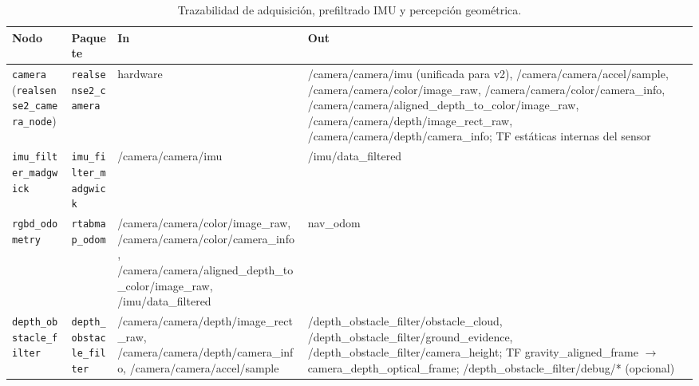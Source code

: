 \begin{table}[p]
    \centering
    \scriptsize
    \setlength{\extrarowheight}{2pt}
    \begin{tabularx}{\textwidth}{L{2.8cm}L{2.2cm}XX}
        \hline
        \textbf{Nodo} & \textbf{Paquete} & \textbf{In} & \textbf{Out} \\
        \hline
        \texttt{camera} (\texttt{realsense2\_camera\_node}) & \texttt{realsense2\_camera} & hardware & /camera/camera/imu (unificada para v2), /camera/camera/accel/sample, /camera/camera/color/image\_raw, /camera/camera/color/camera\_info, /camera/camera/aligned\_depth\_to\_color/image\_raw, /camera/camera/depth/image\_rect\_raw, /camera/camera/depth/camera\_info; TF estáticas internas del sensor \\
        \addlinespace
        \texttt{imu\_filter\_madgwick} & \texttt{imu\_filter\_madgwick} & /camera/camera/imu & /imu/data\_filtered \\
        \addlinespace
        \texttt{rgbd\_odometry} & \texttt{rtabmap\_odom} & /camera/camera/color/image\_raw, /camera/camera/color/camera\_info, /camera/camera/aligned\_depth\_to\_color/image\_raw, /imu/data\_filtered & nav\_odom \\
        \addlinespace
        \texttt{depth\_obstacle\_filter} & \texttt{depth\_obstacle\_filter} & /camera/camera/depth/image\_rect\_raw, /camera/camera/depth/camera\_info, /camera/camera/accel/sample & /depth\_obstacle\_filter/obstacle\_cloud, /depth\_obstacle\_filter/ground\_evidence, /depth\_obstacle\_filter/camera\_height; TF gravity\_aligned\_frame $\to$ camera\_depth\_optical\_frame; /depth\_obstacle\_filter/debug/* (opcional) \\
        \hline
    \end{tabularx}
    \caption{Trazabilidad de adquisición, prefiltrado IMU y percepción geométrica.}
    \label{tab:anexo-trazabilidad-adquisicion}
\end{table}

